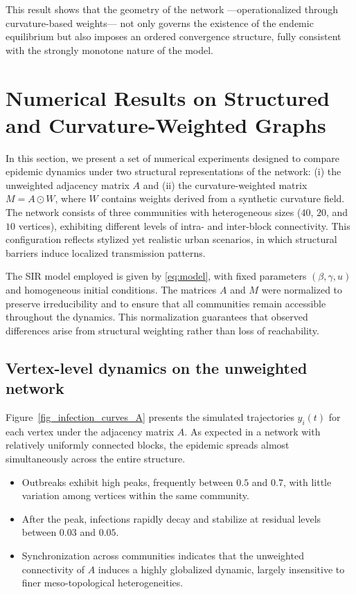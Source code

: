 \documentclass[final,3p,times,twocolumn]{elsarticle}
\begin{document}
This result shows that the geometry of the network —operationalized through
curvature-based weights— not only governs the existence of the endemic
equilibrium but also imposes an ordered convergence structure, fully consistent
with the strongly monotone nature of the model.

\section{Numerical Results on Structured and Curvature-Weighted Graphs}

In this section, we present a set of numerical experiments designed to compare epidemic dynamics under two structural representations of the network: (i) the unweighted adjacency matrix $A$ and (ii) the curvature-weighted matrix $M = A \odot W$, where $W$ contains weights derived from a synthetic curvature field. The network consists of three communities with heterogeneous sizes ($40$, $20$, and $10$ vertices), exhibiting different levels of intra- and inter-block connectivity. This configuration reflects stylized yet realistic urban scenarios, in which structural barriers induce localized transmission patterns.

The SIR model employed is given by \eqref{eq:model}, with fixed parameters $(\beta,\gamma,u)$ and homogeneous initial conditions. The matrices $A$ and $M$ were normalized to preserve irreducibility and to ensure that all communities remain accessible throughout the dynamics. This normalization guarantees that observed differences arise from structural weighting rather than loss of reachability.

\subsection{Vertex-level dynamics on the unweighted network}

Figure~\ref{fig_infection_curves_A} presents the simulated trajectories $y_i(t)$ for each vertex under the adjacency matrix $A$. As expected in a network with relatively uniformly connected blocks, the epidemic spreads almost simultaneously across the entire structure.

\begin{itemize}[label=--]
    \item Outbreaks exhibit high peaks, frequently between $0.5$ and $0.7$, with little variation among vertices within the same community.
    \item After the peak, infections rapidly decay and stabilize at residual levels between $0.03$ and $0.05$.
    \item Synchronization across communities indicates that the unweighted connectivity of $A$ induces a highly globalized dynamic, largely insensitive to finer meso-topological heterogeneities.
\end{itemize}
\end{document}
